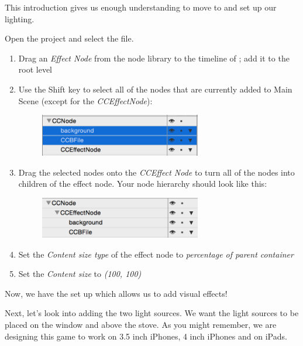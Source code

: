 This introduction gives us enough understanding to move to \SB{} and set up our
lighting.

\begin{leftbar}
Open the \SB{} project and select the 
file.
\begin{enumerate}
  \item Drag an \textit{Effect Node} from the node library to the timeline of
  ; add it to the root level
  \item Use the {Shift} key to select all of the nodes that are currently added
  to Main Scene (except for the \textit{CCEffectNode}): \begin{figure}[H]
    \centering
    \includegraphics[width=200pt]{images/Chapter9/copy_nodes_effect.png}
    \end{figure}
  \item Drag the selected nodes onto the \textit{CCEffect Node} to turn all of
  the nodes into children of the effect node. Your node hierarchy should look like this:
  \begin{figure}[H]
    \centering
    \includegraphics[width=200pt]{images/Chapter9/node_hierarchy_effect2.png}
  \end{figure}
  \item Set the \textit{Content size type} of the effect node to
  \textit{percentage of parent container} 
  \item Set the \textit{Content size} to \textit{(100, 100)}
\end{enumerate}
\end{leftbar}

Now, we have the  set up which allows us to add visual
effects!

Next, let's look into adding the two light sources. We want the light sources to
be placed on the window and above the stove. As you might remember, we are
designing this game to work on 3.5 inch iPhones, 4 inch iPhones and on iPads. 

